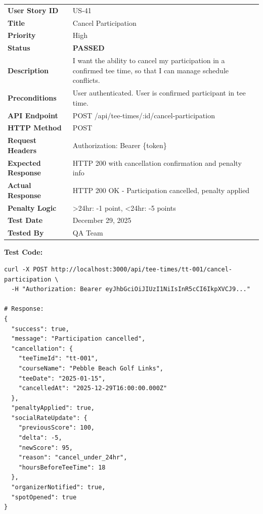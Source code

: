 \documentclass[11pt,a4paper]{article}
\newcommand{\passed}{\textcolor{pass}{\textbf{PASSED}}}
\begin{document}
\begin{tabularx}{\textwidth}{|p{3.2cm}|Y|}
\hline
{}
 \\
\hline
\textbf{User Story ID} & US-41 \\
\hline
\textbf{Title} & Cancel Participation \\
\hline
\textbf{Priority} & High \\
\hline
\textbf{Status} & \passed \\
\hline
\textbf{Description} & I want the ability to cancel my participation in a confirmed tee time, so that I can manage schedule conflicts. \\
\hline
\textbf{Preconditions} & User authenticated. User is confirmed participant in tee time. \\
\hline
\textbf{API Endpoint} & POST /api/tee-times/:id/cancel-participation \\
\hline
\textbf{HTTP Method} & POST \\
\hline
\textbf{Request Headers} & Authorization: Bearer \{token\} \\
\hline
\textbf{Expected Response} & HTTP 200 with cancellation confirmation and penalty info \\
\hline
\textbf{Actual Response} & HTTP 200 OK - Participation cancelled, penalty applied \\
\hline
\textbf{Penalty Logic} & >24hr: -1 point, <24hr: -5 points \\
\hline
\textbf{Test Date} & December 29, 2025 \\
\hline
\textbf{Tested By} & QA Team \\
\hline
\end{tabularx}

\vspace{0.3cm}
\textbf{Test Code:}
\begin{lstlisting}
curl -X POST http://localhost:3000/api/tee-times/tt-001/cancel-participation \
  -H "Authorization: Bearer eyJhbGciOiJIUzI1NiIsInR5cCI6IkpXVCJ9..."

# Response:
{
  "success": true,
  "message": "Participation cancelled",
  "cancellation": {
    "teeTimeId": "tt-001",
    "courseName": "Pebble Beach Golf Links",
    "teeDate": "2025-01-15",
    "cancelledAt": "2025-12-29T16:00:00.000Z"
  },
  "penaltyApplied": true,
  "socialRateUpdate": {
    "previousScore": 100,
    "delta": -5,
    "newScore": 95,
    "reason": "cancel_under_24hr",
    "hoursBeforeTeeTime": 18
  },
  "organizerNotified": true,
  "spotOpened": true
}
\end{lstlisting}
\end{document}
